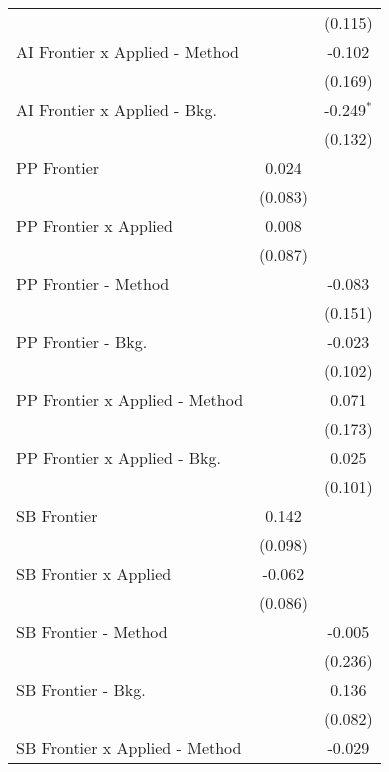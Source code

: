 \begin{tabular}{lcc}
                                  &              & (0.115)\\   
   AI Frontier x Applied - Method &              & -0.102\\   
                                  &              & (0.169)\\   
   AI Frontier x Applied - Bkg.   &              & -0.249$^{*}$\\   
                                  &              & (0.132)\\   
   PP Frontier                    & 0.024        &   \\   
                                  & (0.083)      &   \\   
   PP Frontier x Applied          & 0.008        &   \\   
                                  & (0.087)      &   \\   
   PP Frontier - Method           &              & -0.083\\   
                                  &              & (0.151)\\   
   PP Frontier - Bkg.             &              & -0.023\\   
                                  &              & (0.102)\\   
   PP Frontier x Applied - Method &              & 0.071\\   
                                  &              & (0.173)\\   
   PP Frontier x Applied - Bkg.   &              & 0.025\\   
                                  &              & (0.101)\\   
   SB Frontier                    & 0.142        &   \\   
                                  & (0.098)      &   \\   
   SB Frontier x Applied          & -0.062       &   \\   
                                  & (0.086)      &   \\   
   SB Frontier - Method           &              & -0.005\\   
                                  &              & (0.236)\\   
   SB Frontier - Bkg.             &              & 0.136\\   
                                  &              & (0.082)\\   
   SB Frontier x Applied - Method &              & -0.029\\   

\end{tabular}
